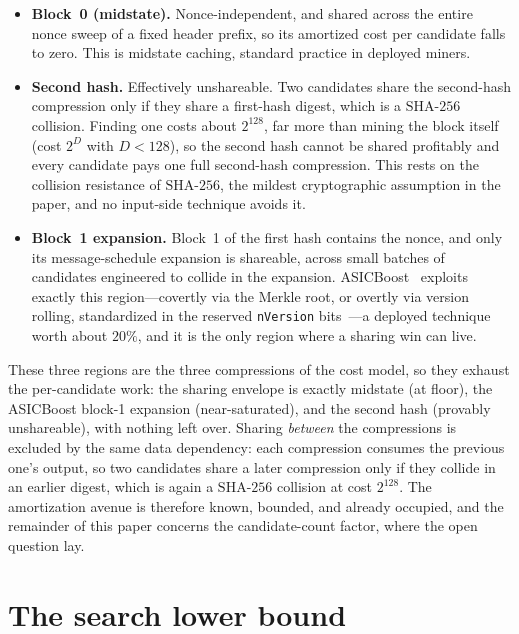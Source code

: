 \documentclass[11pt]{article}
\theoremstyle{remark}
\newcommand{\SHA}{\mathrm{SHA\text{-}256}}
\begin{document}
\begin{itemize}
\item \textbf{Block~0 (midstate).} Nonce-independent, and shared across
  the entire nonce sweep of a fixed header prefix, so its amortized cost
  per candidate falls to zero. This is midstate caching, standard practice
  in deployed miners.
\item \textbf{Second hash.} Effectively unshareable. Two candidates share
  the second-hash compression only if they share a first-hash digest,
  which is a $\SHA$ collision. Finding one costs about $2^{128}$, far more
  than mining the block itself (cost $2^{D}$ with $D < 128$), so the
  second hash cannot be shared profitably and every candidate pays one
  full second-hash compression. This rests on the collision resistance of
  $\SHA$, the mildest cryptographic assumption in the paper, and no
  input-side technique avoids it.
\item \textbf{Block~1 expansion.} Block~1 of the first hash contains the
  nonce, and only its message-schedule expansion is shareable, across
  small batches of candidates engineered to collide in the expansion.
  ASICBoost~\cite{asicboost} exploits exactly this region---covertly via
  the Merkle root, or overtly via version rolling, standardized in the
  reserved \texttt{nVersion} bits~\cite{bip320}---a deployed technique
  worth about $20\%$, and it is the only region where a sharing win can
  live.
\end{itemize}

These three regions are the three compressions of the cost model, so they
exhaust the per-candidate work: the sharing envelope is exactly midstate
(at floor), the ASICBoost block-1 expansion (near-saturated), and the
second hash (provably unshareable), with nothing left over. Sharing
\emph{between} the compressions is excluded by the same data dependency:
each compression consumes the previous one's output, so two candidates
share a later compression only if they collide in an earlier digest, which
is again a $\SHA$ collision at cost $2^{128}$. The
amortization avenue is therefore known, bounded, and already occupied,
and the remainder of this paper concerns the candidate-count factor,
where the open question lay.

\section{The search lower bound}\label{sec:search}
\end{document}
